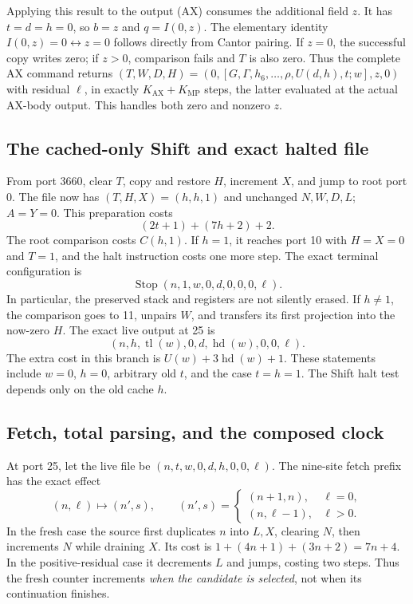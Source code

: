 Applying this result to the output (AX) consumes the additional field
$z$.  It has $t=d=h=0$, so $b=z$ and $q=I(0,z)$.
The elementary identity $I(0,z)=0\leftrightarrow z=0$ follows directly
from Cantor pairing.  If $z=0$, the successful copy writes zero; if $z>0$,
comparison fails and $T$ is also zero.  Thus the complete AX command
returns $(T,W,D,H)=(0,[G,\Gamma,h_6,\ldots,\rho,U(d,h),t;w],z,0)$
with residual $\ell$, in exactly
$K_{\mathrm{AX}}+K_{\mathrm{MP}}$ steps, the latter evaluated at the
actual AX-body output.  This handles both zero and nonzero $z$.

\subsection{The cached-only Shift and exact halted file}

From port 3660, clear $T$, copy and restore $H$, increment $X$, and
jump to root port 0.  The file now has $(T,H,X)=(h,h,1)$ and unchanged
$N,W,D,L$; $A=Y=0$.  This preparation costs
\[
 (2t+1)+(7h+2)+2.
\]
The root comparison costs $C(h,1)$.  If $h=1$, it reaches port 10
with $H=X=0$ and $T=1$, and the halt instruction costs one more step.
The exact terminal configuration is
\[
 \operatorname{Stop}(n,1,w,0,d,0,0,0,\ell).                 \tag{SH}
\]
In particular, the preserved stack and registers are not silently erased.
If $h\ne1$, the comparison goes to 11, unpairs $W$, and transfers its
first projection into the now-zero $H$.  The exact live output at 25 is
\[
 (n,h,\operatorname{tl}(w),0,d,\operatorname{hd}(w),0,0,\ell).
\]
The extra cost in this branch is $U(w)+3\operatorname{hd}(w)+1$.
These statements include $w=0$, $h=0$, arbitrary old $t$, and the case
$t=h=1$.  The Shift halt test depends only on the old cache $h$.

\subsection{Fetch, total parsing, and the composed clock}

At port 25, let the live file be $(n,t,w,0,d,h,0,0,\ell)$.
The nine-site fetch prefix has the exact effect
\[
 (n,\ell)\longmapsto(n',s),\qquad
 (n',s)=
 \begin{cases}(n+1,n),&\ell=0,\\(n,\ell-1),&\ell>0.
 \end{cases}                                             \tag{F}
\]
In the fresh case the source first duplicates $n$ into $L,X$, clearing
$N$, then increments $N$ while draining $X$.  Its cost is
$1+(4n+1)+(3n+2)=7n+4$.  In the positive-residual case it decrements
$L$ and jumps, costing two steps.  Thus the fresh counter increments
\emph{when the candidate is selected}, not when its continuation finishes.

